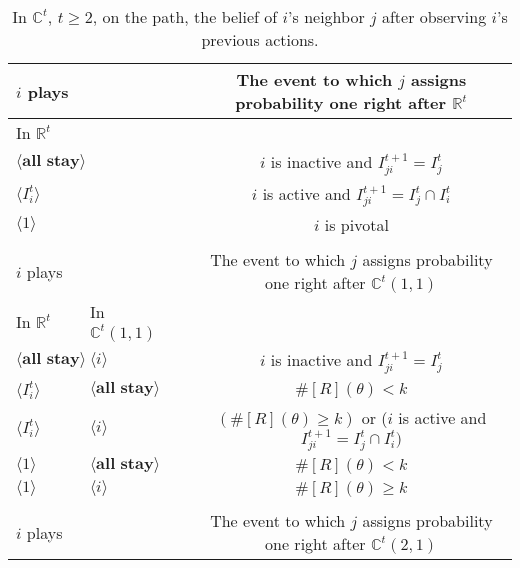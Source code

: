 \documentclass[12pt,letter]{article}
\newcommand{\Kappa}{\mathbb{C}}
\newcommand{\Omicron}{\mathbb{R}}
\theoremstyle{definition}
\theoremstyle{definition}
\theoremstyle{remark}
\theoremstyle{claim}
\begin{document}
\begin{table}[!htbp]
\caption{In $\Kappa^t$, $t\geq 2$, on the path, the belief of $i$'s neighbor $j$ after observing $i$'s previous actions.}
\label{Table_blf_cdt}
\begin{center}
\begin{tabular}{l l l | c}
 $i$ plays  	&&	&	 The event to which $j$ assigns probability one right after $\Omicron^t$\\
\hline
\hline
 In $\Omicron^t$		&&&					 \\
\hline
$\langle \textbf{all stay} \rangle$  &&&     $i$ is inactive and $I^{t+1}_{ji}=I^t_j$ \\
$\langle I^t_{i} \rangle$  &&&     $i$ is active and $I^{t+1}_{ji}=I^t_j\cap I^t_{i}$ \\
$\langle 1 \rangle$  &&& 	  $i$ is pivotal    \\
\hline
\\
 $i$ plays	&&			  & The event to which $j$ assigns probability one right after $\Kappa^t(1,1)$\\
\hline
\hline
	  In $\Omicron^t$	 	&		In $\Kappa^t(1,1)$	&		&		  \\
\hline
$\langle \textbf{all stay} \rangle$  & $\langle i \rangle$	&&    $i$ is inactive and $I^{t+1}_{ji}=I^t_j$  \\
$\langle I^t_{i} \rangle$  & $\langle \textbf{all stay} \rangle$	&&    $\#[R](\theta)< k$ \\
$\langle I^t_{i} \rangle$  & $\langle i \rangle$	&&   $(\#[R](\theta)\geq k )$ or  ($i$ is active and $I^{t+1}_{ji}=I^t_j\cap I^t_{i})$\\
$\langle 1 \rangle$  & $\langle \textbf{all stay} \rangle$	&&	  $\#[R](\theta)< k$    \\
$\langle 1 \rangle$  & $\langle i \rangle$	&&	  $\#[R](\theta)\geq k$  \\
\hline
\\
 $i$ plays  	&		&  	  &The event to which $j$ assigns probability one right after $\Kappa^t(2,1)$\\

\end{tabular}
\end{center}
\end{table}
\end{document}
